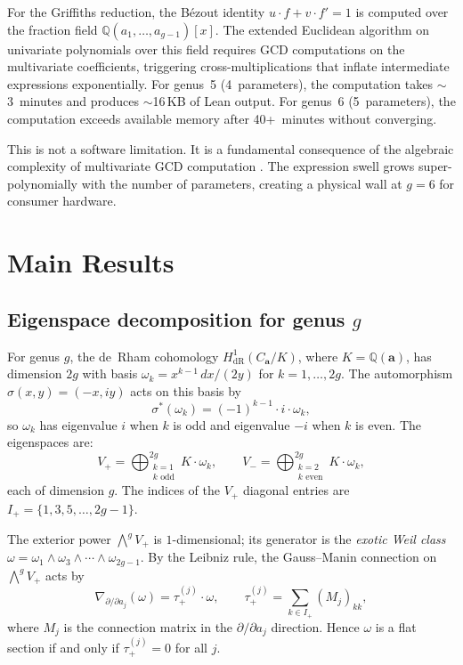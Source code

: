 \documentclass[11pt]{article}
\theoremstyle{plain}
\theoremstyle{definition}
\theoremstyle{remark}
\newcommand{\QQ}{\mathbb{Q}}
\begin{document}
For the Griffiths reduction, the B\'ezout identity
$u \cdot f + v \cdot f' = 1$ is computed over the fraction field
$\QQ(a_1, \ldots, a_{g-1})[x]$.  The extended Euclidean algorithm on
univariate polynomials over this field requires GCD computations on the
multivariate coefficients, triggering cross-multiplications that inflate
intermediate expressions exponentially.  For genus~5 (4~parameters), the
computation takes $\sim$3~minutes and produces $\sim$16\,KB of Lean output.
For genus~6 (5~parameters), the computation exceeds available memory after
40+~minutes without converging.

This is not a software limitation.  It is a fundamental consequence of
the algebraic complexity of multivariate GCD computation
\cite{vonzurgathen2013}.  The expression swell grows super-polynomially
with the number of parameters, creating a physical wall at $g = 6$ for
consumer hardware.

\section{Main Results}
\label{sec:main}

\subsection{Eigenspace decomposition for genus $g$}

For genus $g$, the de~Rham cohomology
$H^1_{\mathrm{dR}}(C_{\mathbf{a}}/K)$, where $K = \QQ(\mathbf{a})$,
has dimension $2g$ with basis $\omega_k = x^{k-1}\,dx/(2y)$ for
$k = 1, \ldots, 2g$.  The automorphism $\sigma(x,y) = (-x,iy)$
acts on this basis by
\[
  \sigma^*(\omega_k) = (-1)^{k-1} \cdot i \cdot \omega_k,
\]
so $\omega_k$ has eigenvalue $i$ when $k$ is odd and eigenvalue $-i$
when $k$ is even.  The eigenspaces are:
\[
  V_+ = \bigoplus_{\substack{k = 1 \\ k \text{ odd}}}^{2g}
    K \cdot \omega_k, \qquad
  V_- = \bigoplus_{\substack{k = 2 \\ k \text{ even}}}^{2g}
    K \cdot \omega_k,
\]
each of dimension $g$.  The indices of the $V_+$ diagonal entries are
$I_+ = \{1, 3, 5, \ldots, 2g-1\}$.

The exterior power $\bigwedge^g V_+$ is $1$-dimensional; its generator
is the \emph{exotic Weil class}
$\omega = \omega_1 \wedge \omega_3 \wedge \cdots \wedge \omega_{2g-1}$.
By the Leibniz rule, the Gauss--Manin connection on $\bigwedge^g V_+$ acts
by
\[
  \nabla_{\partial/\partial a_j}(\omega)
    = \tau_+^{(j)} \cdot \omega,
  \qquad
  \tau_+^{(j)} = \sum_{k \in I_+} (M_j)_{kk},
\]
where $M_j$ is the connection matrix in the $\partial/\partial a_j$ direction.
Hence $\omega$ is a flat section if and only if $\tau_+^{(j)} = 0$ for all $j$.
\end{document}
